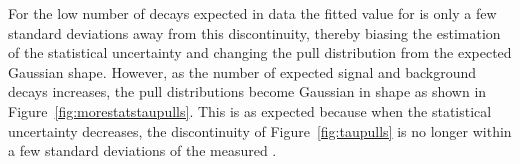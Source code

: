 For the low number of \bsmumu decays expected in data the fitted value for \tmumu is only a few standard deviations away from this discontinuity, thereby biasing the estimation of the statistical uncertainty and changing the pull distribution from the expected Gaussian shape. However, as the number of expected signal and background decays increases, the \tmumu pull distributions become Gaussian in shape as shown in Figure~\ref{fig:morestatstaupulls}. This is as expected because when the statistical uncertainty decreases, the discontinuity of Figure~\ref{fig:taupulls} is no longer within a few standard deviations of the measured \tmumu.           
%                                                                                                                                                   
%                                                                                                                                                   
%                                                                                                                                                   
